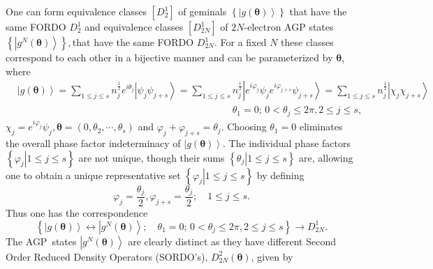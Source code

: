 \documentclass[aps,preprint]{revtex4}%
\begin{document}
One can form equivalence classes $\left[  D_{2}^{1}\right]  $ of geminals
$\left\{  \left\vert g\left(  \mathbf{\theta}\right)  \right\rangle \right\}
$ that have the same FORDO $D_{2}^{1}$ and equivalence classes $\left[
D_{2N}^{1}\right]  $ of $2N$-electron AGP states $\left\{  \left\vert
g^{N}\left(  \mathbf{\theta}\right)  \right\rangle \right\}  ,$that have the
same FORDO $D_{2N}^{1}$. For a fixed $N$ these classes correspond to each
other in a bijective manner \cite{coleman} and can be parameterized by
$\mathbf{\theta}$, where
\begin{align}
&  \left\vert g\left(  \mathbf{\theta}\right)  \right\rangle =\sum_{1\leq
j\leq s}n_{j}^{\frac{1}{2}}e^{i\theta_{j}}\left\vert \psi_{j}\psi
_{j+s}\right\rangle =\sum_{1\leq j\leq s}n_{j}^{\frac{1}{2}}\left\vert
e^{i\varphi_{j}}\psi_{j}e^{i\varphi_{j+s}}\psi_{j+s}\right\rangle =\sum_{1\leq
j\leq s}n_{j}^{\frac{1}{2}}\left\vert \chi_{j}\chi_{j+s}\right\rangle
\nonumber\\
&  \qquad\qquad\qquad\qquad\qquad\qquad\qquad\qquad\qquad\qquad\qquad
\theta_{1}=0;\,0<\theta_{j}\leq2\pi,2\leq j\leq s,
\end{align}
$\chi_{j}=e^{i\varphi_{j}}\psi_{j},\mathbf{\theta=}\left(  0,\theta_{2}%
,\cdots,\theta_{s}\right)  $ and $\varphi_{j}+\varphi_{j+s}=\theta_{j}$.
Choosing $\theta_{1}=0$ eliminates the overall phase factor indeterminacy of
$\left\vert g\left(  \mathbf{\theta}\right)  \right\rangle $. The individual
phase factors $\left\{  \left.  \varphi_{j}\right\vert 1\leq j\leq s\right\}
$ are not unique, though their sums $\left\{  \left.  \theta_{j}\right\vert
1\leq j\leq s\right\}  $ are, allowing one to obtain a unique representative
set $\left\{  \left.  \varphi_{j}\right\vert 1\leq j\leq s\right\}  $ by
defining
\begin{equation}
\varphi_{j}=\frac{\theta_{j}}{2},\varphi_{j+s}=\frac{\theta_{j}}{2};\quad1\leq
j\leq s.
\end{equation}
Thus one has the correspondence
\begin{equation}
\left\{  \left\vert g\left(  \mathbf{\theta}\right)  \right\rangle
\longleftrightarrow\left\vert g^{N}\left(  \mathbf{\theta}\right)
\right\rangle ;\quad\theta_{1}=0;\,0<\theta_{j}\leq2\pi,2\leq j\leq s\right\}
\rightarrow D_{2N}^{1}.
\end{equation}
The AGP\ states $\left\vert g^{N}\left(  \mathbf{\theta}\right)  \right\rangle
$ are clearly distinct as they have different Second Order Reduced Density
Operators (SORDO's), $D_{2N}^{2}\left(  \mathbf{\theta}\right)  $, given by
\cite{Coleman}
\end{document}
